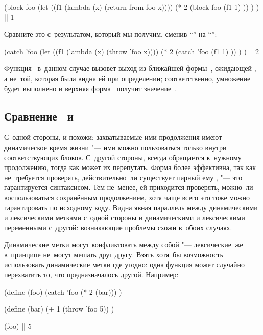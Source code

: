 \begin{code:lisp}
(block foo
  (let ((f1 (lambda (x) (return-from foo x))))
    (* 2 (block foo
           (f1 1) )) ) ) |\is| 1
\end{code:lisp}

Сравните это с~результатом, который мы получим, сменив "`"' на
"`"':

\begin{code:lisp}
(catch 'foo
  (let ((f1 (lambda (x) (throw 'foo x))))
    (* 2 (catch 'foo
           (f1 1) )) ) ) |\is| 2
\end{code:lisp}

Функция~ в~данном случае вызовет выход из ближайшей формы~,
ожидающей , а не~той, которая была видна ей при определении;
соответственно, умножение будет выполнено и верхняя форма~ получит
значение~.


\subsection{\texorpdfstring%
{Сравнение \protect{}~и~\protect{}}%
{Сравнение catch и block}}%
\label{escape/forms/ssect:catch-vs-block}

С~одной стороны,  и  похожи: захватываемые ими продолжения
имеют динамическое время жизни "--- ими можно пользоваться только внутри
соответствующих блоков. С~другой стороны,  всегда обращается
к~нужному продолжению, тогда как  может их перепутать. Форма
 более эффективна, так как  не~требуется проверять,
действительно~ли существует парный ему , "--- это гарантируется
синтаксисом. Тем не~менее, ей приходится проверять, можно~ли воспользоваться
сохранённым продолжением, хотя чаще всего это тоже можно гарантировать по
исходному коду. Видна явная параллель между динамическими и лексическими метками
с~одной стороны и динамическими и лексическими переменными с~другой: возникающие
проблемы схожи в~обоих случаях.

Динамические метки могут конфликтовать между собой "--- лексические~же
в~принципе не~могут мешать друг другу. Взять хотя~бы возможность использовать
динамические метки где угодно: одна функция может случайно перехватить то, что
предназначалось другой. Например:

\begin{code:lisp}
(define (foo)
  (catch 'foo (* 2 (bar))) )

(define (bar)
  (+ 1 (throw 'foo 5)) )

(foo) |\is| 5
\end{code:lisp}

